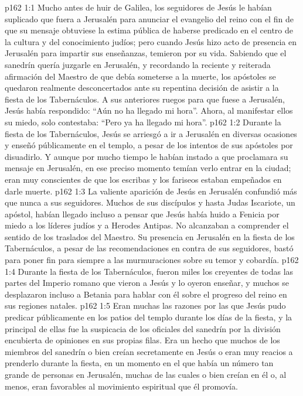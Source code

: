 \vs p162 1:1 Mucho antes de huir de Galilea, los seguidores de Jesús le habían suplicado que fuera a Jerusalén para anunciar el evangelio del reino con el fin de que su mensaje obtuviese la estima pública de haberse predicado en el centro de la cultura y del conocimiento judíos; pero cuando Jesús hizo acto de presencia en Jerusalén para impartir sus enseñanzas, temieron por su vida. Sabiendo que el sanedrín quería juzgarle en Jerusalén, y recordando la reciente y reiterada afirmación del Maestro de que debía someterse a la muerte, los apóstoles se quedaron realmente desconcertados ante su repentina decisión de asistir a la fiesta de los Tabernáculos. A sus anteriores ruegos para que fuese a Jerusalén, Jesús había respondido: “Aún no ha llegado mi hora”. Ahora, al manifestar ellos su miedo, solo contestaba: “Pero ya ha llegado mi hora”.
\vs p162 1:2 Durante la fiesta de los Tabernáculos, Jesús se arriesgó a ir a Jerusalén en diversas ocasiones y enseñó públicamente en el templo, a pesar de los intentos de sus apóstoles por disuadirlo. Y aunque por mucho tiempo le habían instado a que proclamara su mensaje en Jerusalén, en ese preciso momento temían verlo entrar en la ciudad; eran muy conscientes de que los escribas y los fariseos estaban empeñados en darle muerte.
\vs p162 1:3 La valiente aparición de Jesús en Jerusalén confundió más que nunca a sus seguidores. Muchos de sus discípulos y hasta Judas Iscariote, un apóstol, habían llegado incluso a pensar que Jesús había huido a Fenicia por miedo a los líderes judíos y a Herodes Antipas. No alcanzaban a comprender el sentido de los traslados del Maestro. Su presencia en Jerusalén en la fiesta de los Tabernáculos, a pesar de las recomendaciones en contra de sus seguidores, bastó para poner fin para siempre a las murmuraciones sobre su temor y cobardía.
\vs p162 1:4 Durante la fiesta de los Tabernáculos, fueron miles los creyentes de todas las partes del Imperio romano que vieron a Jesús y lo oyeron enseñar, y muchos se desplazaron incluso a Betania para hablar con él sobre el progreso del reino en sus regiones natales.
\vs p162 1:5 Eran muchas las razones por las que Jesús pudo predicar públicamente en los patios del templo durante los días de la fiesta, y la principal de ellas fue la suspicacia de los oficiales del sanedrín por la división encubierta de opiniones en sus propias filas. Era un hecho que muchos de los miembros del sanedrín o bien creían secretamente en Jesús o eran muy reacios a prenderlo durante la fiesta, en un momento en el que había un número tan grande de personas en Jerusalén, muchas de las cuales o bien creían en él o, al menos, eran favorables al movimiento espiritual que él promovía.
